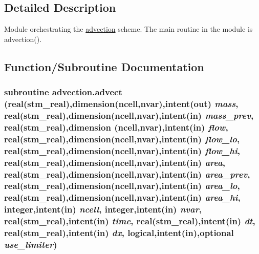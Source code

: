 \subsection{Detailed Description}
Module orchestrating the \hyperlink{a00049}{advection} scheme. The main routine in the module is advection(). 



\subsection{Function/Subroutine Documentation}
\hypertarget{a00049_9ec45d9c2fabe0abb0a60795bc228f59}{
\subsubsection[{advect}]{\setlength{\rightskip}{0pt plus 5cm}subroutine advection.advect (real(stm\_\-real),dimension(ncell,nvar),intent(out) {\em mass}, \/  real(stm\_\-real),dimension(ncell,nvar),intent(in) {\em mass\_\-prev}, \/  real(stm\_\-real),dimension   (ncell,nvar),intent(in) {\em flow}, \/  real(stm\_\-real),dimension(ncell,nvar),intent(in) {\em flow\_\-lo}, \/  real(stm\_\-real),dimension(ncell,nvar),intent(in) {\em flow\_\-hi}, \/  real(stm\_\-real),dimension(ncell,nvar),intent(in) {\em area}, \/  real(stm\_\-real),dimension(ncell,nvar),intent(in) {\em area\_\-prev}, \/  real(stm\_\-real),dimension(ncell,nvar),intent(in) {\em area\_\-lo}, \/  real(stm\_\-real),dimension(ncell,nvar),intent(in) {\em area\_\-hi}, \/  integer,intent(in) {\em ncell}, \/  integer,intent(in) {\em nvar}, \/  real(stm\_\-real),intent(in) {\em time}, \/  real(stm\_\-real),intent(in) {\em dt}, \/  real(stm\_\-real),intent(in) {\em dx}, \/  logical,intent(in),optional {\em use\_\-limiter})}}
\label{a00049_9ec45d9c2fabe0abb0a60795bc228f59}


